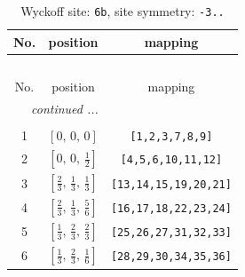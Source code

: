 \documentclass[fleqn,8pt]{jsarticle}
\begin{document}
\begin{longtable}{ccc}
\caption{Wyckoff site: {\tt 6b}, site symmetry: {\tt -3..}}
 \\
 \hline \hline
No. & position & mapping \\ \hline \endfirsthead

\multicolumn{2}{l}{\tablename\ \thetable{}} \\
 \hline \hline
No. & position & mapping \\ \hline \endhead

 \hline \hline
\multicolumn{2}{r}{\footnotesize\it continued ...} \\ \endfoot

 \hline \hline
\multicolumn{2}{r}{} \\ \endlastfoot

1 & $\left[ 0,\, 0,\, 0 \right]$ & {\tt [1,2,3,7,8,9]} \\ \hline
2 & $\left[ 0,\, 0,\, \frac{1}{2} \right]$ & {\tt [4,5,6,10,11,12]} \\ \hline
3 & $\left[ \frac{2}{3},\, \frac{1}{3},\, \frac{1}{3} \right]$ & {\tt [13,14,15,19,20,21]} \\ \hline
4 & $\left[ \frac{2}{3},\, \frac{1}{3},\, \frac{5}{6} \right]$ & {\tt [16,17,18,22,23,24]} \\ \hline
5 & $\left[ \frac{1}{3},\, \frac{2}{3},\, \frac{2}{3} \right]$ & {\tt [25,26,27,31,32,33]} \\ \hline
6 & $\left[ \frac{1}{3},\, \frac{2}{3},\, \frac{1}{6} \right]$ & {\tt [28,29,30,34,35,36]} \\
\end{longtable}
\renewcommand{\arraystretch}{1.2}
\end{document}
